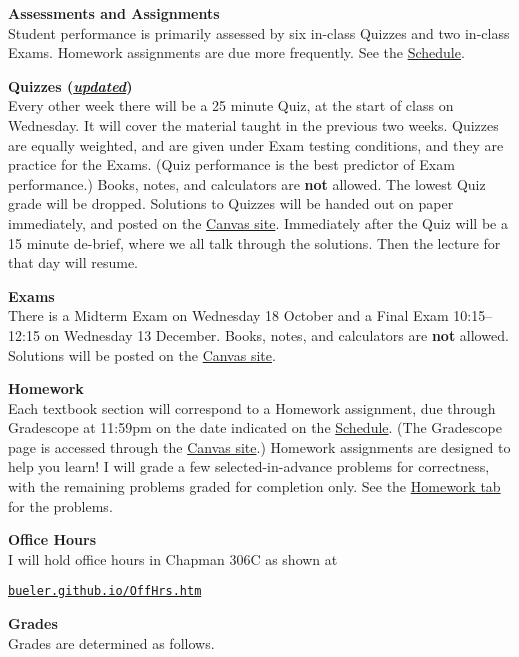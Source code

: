 \documentclass[12pt]{article}
\renewcommand{\emph}[1]{\textsf{\textbf{#1}}}
\newcommand{\localhead}[1]{\par\smallskip\textbf{#1}\nobreak\\}%
\def\heading#1{\localhead{\large\emph{#1}}}
\def\subheading#1{\localhead{\emph{#1}}}
\begin{document}
\heading{Assessments and Assignments}
Student performance is primarily assessed by six in-class Quizzes and two in-class Exams.  Homework assignments are due more frequently.  See the \href{https://bueler.github.io/math302/assets/general/F23/schedule.pdf}{Schedule}.
 

\subheading{Quizzes (\underline{\textsl{updated}})}
Every other week there will be a 25 minute Quiz, at the start of class on Wednesday.  It will cover the material taught in the previous two weeks.  Quizzes are equally weighted, and are given under Exam testing conditions, and they are practice for the Exams.  (Quiz performance is the best predictor of Exam performance.)  Books, notes, and calculators are \emph{not} allowed.  The lowest Quiz grade will be dropped.  Solutions to Quizzes will be handed out on paper immediately, and posted on the \href{https://canvas.alaska.edu/courses/16214}{Canvas site}.  Immediately after the Quiz will be a 15 minute de-brief, where we all talk through the solutions.  Then the lecture for that day will resume.


\subheading{Exams}
There is a Midterm Exam on Wednesday 18 October and a Final Exam 10:15--12:15 on Wednesday 13 December.   Books, notes, and calculators are \emph{not} allowed.  Solutions will be posted on the \href{https://canvas.alaska.edu/courses/16214}{Canvas site}.


\subheading{Homework}
Each textbook section will correspond to a Homework assignment, due through Gradescope at 11:59pm on the date indicated on the \href{https://bueler.github.io/math302/assets/general/F23/schedule.pdf}{Schedule}.  (The Gradescope page is accessed through the \href{https://canvas.alaska.edu/courses/16214}{Canvas site}.)  Homework assignments are designed to help you learn!  I will grade a few selected-in-advance problems for correctness, with the remaining problems graded for completion only.  See the \href{https://bueler.github.io/math302/homework.html}{Homework tab} for the problems.


\heading{Office Hours}
I will hold office hours in Chapman 306C as shown at

\smallskip
\centerline{\href{http://bueler.github.io/OffHrs.htm}{\tt bueler.github.io/OffHrs.htm}}


\clearpage\newpage
\heading{Grades}
Grades are determined as follows.
\end{document}
